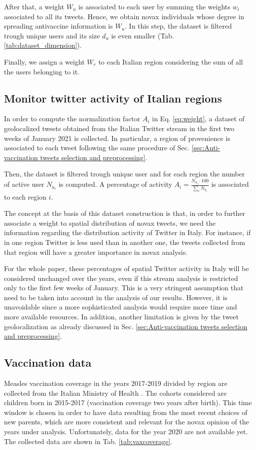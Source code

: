 \documentclass[prb,twocolumn,9pt]{revtex4-1}
\begin{document}
After that, a weight $W_u$ is associated to each user by summing the weights $w_i$ associated to all its tweets. Hence, we obtain novax individuals whose degree in spreading antivaccine information is $W_u$. In this step, the dataset is filtered trough unique users and its size $d_u$ is even smaller (Tab. \ref{tab:dataset_dimension}).

Finally, we assign a weight $W_r$ to each Italian region considering the sum of all the users belonging to it. 


\subsection{Monitor twitter activity of Italian regions}
\label{sec:Monitor twitter activity of Italian regions}
In order to compute the normalization factor $A_i$ in Eq. \eqref{eq:weight}, a dataset of geolocalized tweets obtained from the Italian Twitter stream in the first two weeks of January 2021 is collected. In particular, a region of provenience is associated to each tweet following the same procedure of Sec. \ref{sec:Anti-vaccination tweets selection and preprocessing}. 

Then, the dataset is filtered trough unique user and for each region the number of active user $N_{a_i}$ is computed. A percentage of activity $A_i = \frac{ N_{a_i} \cdot 100}{ \sum_i N_{a_i} } $ is associated to each region $i$. 

The concept at the basis of this dataset construction is that, in order to further associate a weight to spatial distribution of novax tweets, we need the information regarding the distribution activity of Twitter in Italy.
For instance, if in one region Twitter is less used than in another one, the tweets collected from that region will have a greater importance in novax analysis.  

For the whole paper, these percentages of spatial Twitter activity in Italy will be considered unchanged over the years, even if this stream analysis is restricted only to the first few weeks of January. This is a very stringent assumption that need to be taken into account in the analysis of our results. However, it is unavoidable since a more sophisticated analysis would require more time and more available resources.
In addition, another limitation is given by the tweet geolocalization as already discussed in Sec. \ref{sec:Anti-vaccination tweets selection and preprocessing}.


\subsection{Vaccination data}
\label{sec:Vaccination data}
Measles vaccination coverage in the years 2017-2019 divided by region are collected from the Italian Ministry of Health \cite{ministerosalute}. The cohorts considered are children born in 2015-2017 (vaccination coverage two years after birth).
This time window is chosen in order to have data resulting from the most recent choices of new parents, which are more consistent and relevant for the novax opinion of the years under analysis. Unfortunately, data for the year 2020 are not available yet. The collected data are shown in Tab. \ref{tab:vaxcoverage}.
\end{document}
